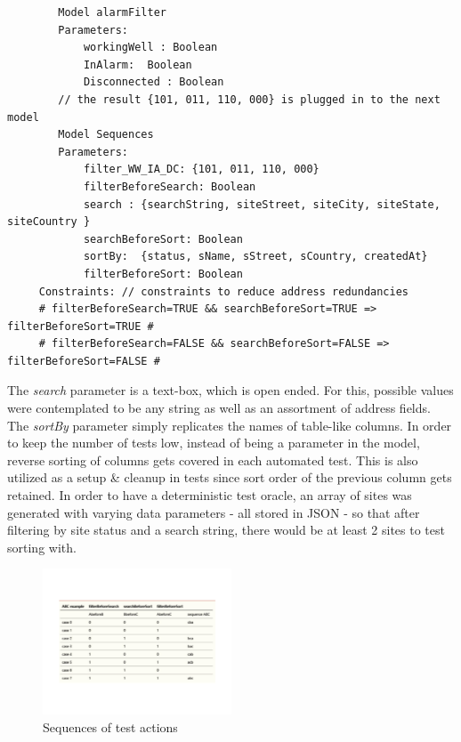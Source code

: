 \documentclass[conference]{IEEEtran}
\begin{document}
	\begin{lstlisting}
		Model alarmFilter
	 	Parameters:
			workingWell : Boolean
			InAlarm:  Boolean
			Disconnected : Boolean
		// the result {101, 011, 110, 000} is plugged in to the next model 	
		Model Sequences
		Parameters:
			filter_WW_IA_DC: {101, 011, 110, 000}
			filterBeforeSearch: Boolean
			search : {searchString, siteStreet, siteCity, siteState, siteCountry }
			searchBeforeSort: Boolean
			sortBy:  {status, sName, sStreet, sCountry, createdAt}
			filterBeforeSort: Boolean
	 Constraints: // constraints to reduce address redundancies
	 # filterBeforeSearch=TRUE && searchBeforeSort=TRUE => filterBeforeSort=TRUE #
	 # filterBeforeSearch=FALSE && searchBeforeSort=FALSE => filterBeforeSort=FALSE #
	\end{lstlisting}

	The \textit{search} parameter is a text-box, which is open ended. For this, possible values were contemplated to be any string as well as an assortment of address fields.
	The \textit{sortBy} parameter simply replicates the names of table-like columns. 
	In order to keep the number of tests low, instead of being a parameter in the model, reverse sorting of columns gets covered in each automated test.
	This is also utilized as a setup \& cleanup in tests since sort order of the previous column gets retained.
	In order to have a deterministic test oracle, an array of sites was generated with varying data parameters - all stored in JSON - so that after filtering by site status and a search string, there would be at least 2 sites to test sorting with.
	
	\begin{figure}[!t]
		\includegraphics[width=0.50\textwidth,]{sorting.pdf}
		\caption{Sequences of test actions}
		\label{fig:sorting}
	\end{figure}
		
\end{document}
